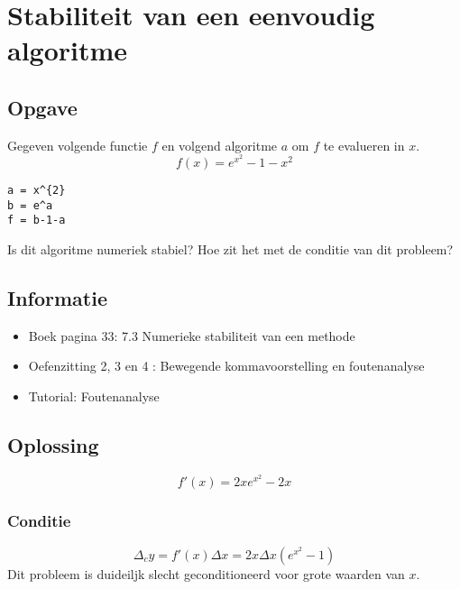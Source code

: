 \documentclass[examenvragen.tex]{subfiles}
\begin{document}
\section{Stabiliteit van een eenvoudig algoritme}
\subsection{Opgave}
Gegeven volgende functie $f$ en volgend algoritme $a$ om $f$ te evalueren in $x$.
\[
f(x) = e^{x^{2}}-1-x^{2}
\]
\begin{lstlisting}
a = x^{2}
b = e^a
f = b-1-a
\end{lstlisting}
Is dit algoritme numeriek stabiel? Hoe zit het met de conditie van dit probleem?

\subsection{Informatie}
\begin{itemize}
\item Boek pagina 33: 7.3 Numerieke stabiliteit van een methode
\item Oefenzitting 2, 3 en 4 : Bewegende kommavoorstelling en foutenanalyse
\item Tutorial: Foutenanalyse
\end{itemize}

\subsection{Oplossing}
\[
f'(x) = 2xe^{x^{2}}-2x
\]
\subsubsection{Conditie}
\[
\Delta_cy = f'(x)\Delta x = 2x\Delta x\left(e^{x^{2}}-1\right)
\]
Dit probleem is duideiljk slecht geconditioneerd voor grote waarden van $x$.
\end{document}
